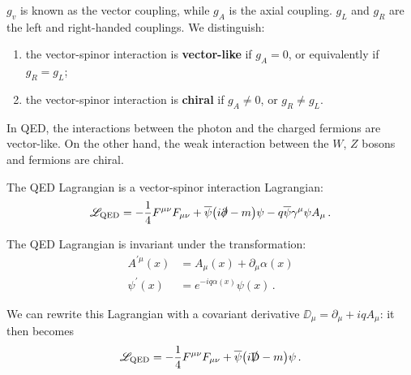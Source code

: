 \documentclass[main.tex]{subfiles}
\begin{document}
\(g_v\) is known as the vector coupling, while \(g_A\) is the axial coupling. \(g_L\) and \(g_R\) are the left and right-handed couplings. We distinguish:
\begin{enumerate}
    \item the vector-spinor interaction is \textbf{vector-like} if \(g_A = 0\), or equivalently if \(g_R = g_L\);
    \item the vector-spinor interaction is \textbf{chiral} if \(g_A \neq 0\), or \(g_R \neq g_L\).
\end{enumerate}

In QED, the interactions between the photon and the charged fermions are vector-like. 
On the other hand, the weak interaction between the \(W\), \(Z\) bosons and fermions are chiral. 

The QED Lagrangian is a vector-spinor interaction Lagrangian:
%
\begin{align}
\mathscr{L} _{\text{QED}} = - \frac{1}{4} F^{\mu \nu } F_{\mu \nu }
+ \overline{\psi} \qty(i \slashed{\partial} - m) \psi 
- q \overline{\psi} \gamma^{\mu } \psi A_{\mu } 
\,.
\end{align}

\begin{claim}
The QED Lagrangian is invariant under the transformation: 
%
\begin{align}
A^{\prime \mu } (x)  &= A_{\mu } (x) + \partial_{\mu } \alpha (x)  \\
\psi^{\prime }(x) &= e^{-iq \alpha (x)} \psi (x)
\,.
\end{align}

We can rewrite this Lagrangian with a covariant derivative \(\DD_{\mu } = \partial_{\mu } + i q A_{\mu }\): it then becomes 
%
\begin{align}
\mathscr{L} _{\text{QED}} = - \frac{1}{4} F^{\mu \nu } F_{\mu \nu }
+ \overline{\psi} \qty(i \slashed{\mathrm{D}} - m) \psi 
\,.
\end{align}
\end{claim}
\end{document}
